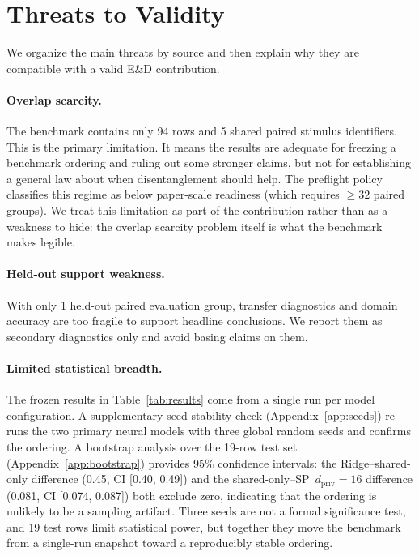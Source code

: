 \documentclass{article}
\begin{document}
\section{Threats to Validity}

We organize the main threats by source and then explain why they are compatible
with a valid E\&D contribution.

\paragraph{Overlap scarcity.}
The benchmark contains only 94 rows and 5 shared paired stimulus identifiers.
This is the primary limitation.  It means the results are adequate for freezing
a benchmark ordering and ruling out some stronger claims, but not for
establishing a general law about when disentanglement should help.  The
preflight policy classifies this regime as below paper-scale readiness (which
requires $\geq\!32$ paired groups).  We treat this limitation as part of the
contribution rather than as a weakness to hide: the overlap scarcity problem
itself is what the benchmark makes legible.

\paragraph{Held-out support weakness.}
With only 1 held-out paired evaluation group, transfer diagnostics and domain
accuracy are too fragile to support headline conclusions.  We report them as
secondary diagnostics only and avoid basing claims on them.

\paragraph{Limited statistical breadth.}
The frozen results in Table~\ref{tab:results} come from a single run per model
configuration.  A supplementary seed-stability check
(Appendix~\ref{app:seeds}) re-runs the two primary neural models with three
global random seeds and confirms the ordering.  A bootstrap analysis over the
19-row test set (Appendix~\ref{app:bootstrap}) provides 95\% confidence
intervals: the Ridge--shared-only difference (0.45, CI [0.40, 0.49]) and the
shared-only--SP~$d_\mathrm{priv}\!=\!16$ difference (0.081, CI [0.074, 0.087])
both exclude zero, indicating that the ordering is unlikely to be a
sampling artifact.  Three seeds are not a formal significance test, and 19 test
rows limit statistical power, but together they move the benchmark from a
single-run snapshot toward a reproducibly stable ordering.
\end{document}
